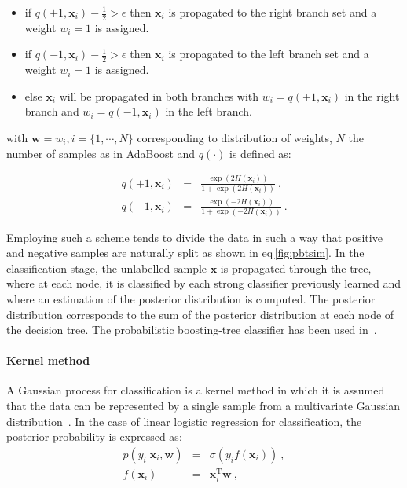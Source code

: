 \begin{itemize}
	\item if $q(+1, \mathbf{x}_i) - \frac{1}{2} > \epsilon$ then $\mathbf{x}_i$ is propagated to the right branch set and a weight $w_i=1$ is assigned. 
	\item if $q(-1, \mathbf{x}_i) - \frac{1}{2} > \epsilon$ then $\mathbf{x}_i$ is propagated to the left branch set and a weight $w_i=1$ is assigned.
	\item else $\mathbf{x}_i$ will be propagated in both branches with $w_i=q(+1, \mathbf{x}_i)$ in the right branch and $w_i=q(-1, \mathbf{x}_i)$ in the left branch.
\end{itemize}

\noindent with $\mathbf{w} = w_i, i=\{1,\cdots,N\}$ corresponding to distribution of weights, $N$ the number of samples as in AdaBoost and $q(\cdot)$ is defined as:

\begin{eqnarray}
	q(+1, \mathbf{x}_i) & = & \frac{\exp(2H(\mathbf{x}_i))}{1+\exp(2H(\mathbf{x}_i))} \ , \label{eq:regada1} \\
	q(-1, \mathbf{x}_i) & = & \frac{\exp(-2H(\mathbf{x}_i))}{1+\exp(-2H(\mathbf{x}_i))} \ . \label{eq:regada2}
\end{eqnarray}

Employing such a scheme tends to divide the data in such a way that positive and negative samples are naturally split as shown in \acs{eq}\,\ref{fig:pbtsim}.
In the classification stage, the unlabelled sample $\mathbf{x}$ is propagated through the tree, where at each node, it is classified by each strong classifier previously learned and where an estimation of the posterior distribution is computed.
The posterior distribution corresponds to the sum of the posterior distribution at each node of the decision tree.
The probabilistic boosting-tree classifier has been used in~\cite{Tiwari2009a,Tiwari2012,Tiwari2010,Viswanath2011}.

\paragraph{Kernel method}
A Gaussian process for classification is a kernel method in which it is assumed that the data can be represented by a single sample from a multivariate Gaussian distribution~\cite{Rasmussen2005}.
In the case of linear logistic regression for classification, the posterior probability is expressed as:
\begin{eqnarray}
	p(y_i|\mathbf{x}_i,\mathbf{w}) & = & \sigma(y_i f(\mathbf{x}_i)) \ , \label{eq:gp1} \\
	f(\mathbf{x}_i) & = & \mathbf{x}_i^{\text{T}} \mathbf{w} \ , \nonumber
\end{eqnarray}

